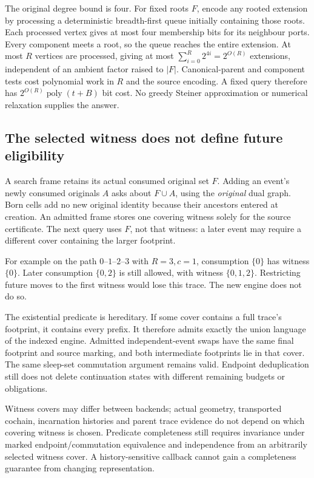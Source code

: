 The original degree bound is four. For fixed roots $F$, encode any rooted
extension by processing a deterministic breadth-first queue initially
containing those roots. Each processed vertex gives at most four membership
bits for its neighbour ports. Every component meets a root, so the queue
reaches the entire extension. At most $R$ vertices are processed, giving
at most $\sum_{i=0}^{R}2^{4i}=2^{O(R)}$ extensions, independent of an
ambient factor raised to $|F|$. Canonical-parent and component tests cost
polynomial work in $R$ and the source encoding. A fixed query therefore
has $2^{O(R)}\operatorname{poly}(t+B)$ bit cost. No greedy Steiner
approximation or numerical relaxation supplies the answer.

\subsection{The selected witness does not define future eligibility}

A search frame retains its actual consumed original set $F$. Adding an
event's newly consumed originals $A$ asks about $F\cup A$, using the
\emph{original} dual graph. Born cells add no new original identity because
their ancestors entered at creation. An admitted frame stores one covering
witness solely for the source certificate. The next query uses $F$, not
that witness: a later event may require a different cover containing the
larger footprint.

For example on the path $0$--$1$--$2$--$3$ with $R=3,c=1$, consumption
$\{0\}$ has witness $\{0\}$. Later consumption $\{0,2\}$ is still allowed,
with witness $\{0,1,2\}$. Restricting future moves to the first witness
would lose this trace. The new engine does not do so.

The existential predicate is hereditary. If some cover contains a full
trace's footprint, it contains every prefix. It therefore admits exactly
the union language of the indexed engine. Admitted independent-event swaps
have the same final footprint and source marking, and both intermediate
footprints lie in that cover. The same sleep-set commutation argument
remains valid. Endpoint deduplication still does not delete continuation
states with different remaining budgets or obligations.

Witness covers may differ between backends; actual geometry, transported
cochain, incarnation histories and parent trace evidence do not depend on
which covering witness is chosen. Predicate completeness still requires
invariance under marked endpoint/commutation equivalence and independence
from an arbitrarily selected witness cover. A history-sensitive callback
cannot gain a completeness guarantee from changing representation.

